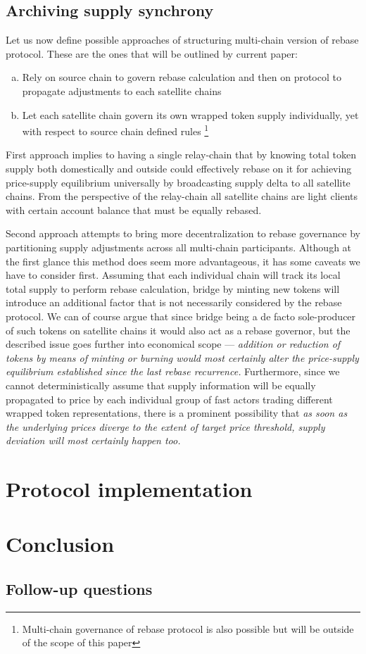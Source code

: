 \documentclass{article}
\newcommand{\astfootnote}[1]{%
	\let\oldthefootnote=\thefootnote%
	\setcounter{footnote}{0}%
	\renewcommand{\thefootnote}{\fnsymbol{footnote}}%
	\footnote{#1}%
	\let\thefootnote=\oldthefootnote%
}
\begin{document}
\subsection{Archiving supply synchrony}

Let us now define possible approaches of structuring multi-chain version of rebase protocol. These are the ones that will be outlined by current paper:

\begin{enumerate}[a.]
	\item Rely on source chain to govern rebase calculation and then on protocol to propagate adjustments to each satellite chains
	\item Let each satellite chain govern its own wrapped token supply individually, yet with respect to source chain defined rules\astfootnote{Multi-chain governance of rebase protocol is also possible but will be outside of the scope of this paper}
\end{enumerate}

First approach implies to having a single relay-chain that by knowing total token supply both domestically and outside could effectively rebase on it for achieving price-supply equilibrium universally by broadcasting supply delta to all satellite chains. From the perspective of the relay-chain all satellite chains are light clients with certain account balance that must be equally rebased.

Second approach attempts to bring more decentralization to rebase governance by partitioning supply adjustments across all multi-chain participants. Although at the first glance this method does seem more advantageous, it has some caveats we have to consider first. Assuming that each individual chain will track its local total supply to perform rebase calculation, bridge by minting new tokens will introduce an additional factor that is not necessarily considered by the rebase protocol. We can of course argue that since bridge being a de facto sole-producer of such tokens on satellite chains it would also act as a rebase governor, but the described issue goes further into economical scope --- \textit{addition or reduction of tokens by means of minting or burning would most certainly alter the price-supply equilibrium established since the last rebase recurrence.} Furthermore, since we cannot deterministically assume that supply information will be equally propagated to price by each individual group of fast actors trading different wrapped token representations, there is a prominent possibility that \textit{as soon as the underlying prices diverge to the extent of target price threshold, supply deviation will most certainly happen too.}

\section{Protocol implementation}

\section{Conclusion}

\subsection{Follow-up questions}



\end{document}
